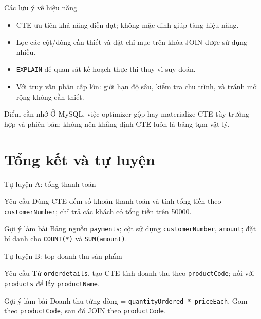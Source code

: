 \documentclass[aspectratio=169,10pt]{beamer}
\newcommand{\code}[1]{\texttt{#1}}
\begin{document}
\begin{frame}[fragile]{Các lưu ý về hiệu năng}
\small
\begin{itemize}
\item CTE ưu tiên khả năng diễn đạt; không mặc định giúp tăng hiệu năng.
\item Lọc các cột/dòng cần thiết và đặt chỉ mục trên khóa JOIN được sử dụng nhiều.
\item \code{EXPLAIN} để quan sát kế hoạch thực thi thay vì suy đoán.
\item Với truy vấn phân cấp lớn: giới hạn độ sâu, kiểm tra chu trình, và tránh mở rộng không cần thiết.
\end{itemize}
\vspace{.3em}\begin{block}{Điểm cần nhớ}
Ở MySQL, việc optimizer gộp hay materialize CTE tùy trường hợp và phiên bản; không nên khẳng định CTE luôn là bảng tạm vật lý.
\end{block}
\end{frame}

\section{Tổng kết và tự luyện}

\begin{frame}[fragile]{Tự luyện A: tổng thanh toán}
\begin{block}{Yêu cầu}
Dùng CTE đếm số khoản thanh toán và tính tổng tiền theo \code{customerNumber}; chỉ trả các khách có tổng tiền trên 50000.
\end{block}
\begin{alertblock}{Gợi ý làm bài}
Bảng nguồn \code{payments}; cột sử dụng \code{customerNumber}, \code{amount}; đặt bí danh cho \code{COUNT(*)} và \code{SUM(amount)}.
\end{alertblock}
\end{frame}

\begin{frame}[fragile]{Tự luyện B: top doanh thu sản phẩm}
\begin{block}{Yêu cầu}
Từ \code{orderdetails}, tạo CTE tính doanh thu theo \code{productCode}; nối với \code{products} để lấy \code{productName}.
\end{block}
\begin{alertblock}{Gợi ý làm bài}
Doanh thu từng dòng = \code{quantityOrdered * priceEach}. Gom theo \code{productCode}, sau đó JOIN theo \code{productCode}.
\end{alertblock}
\end{frame}
\end{document}
